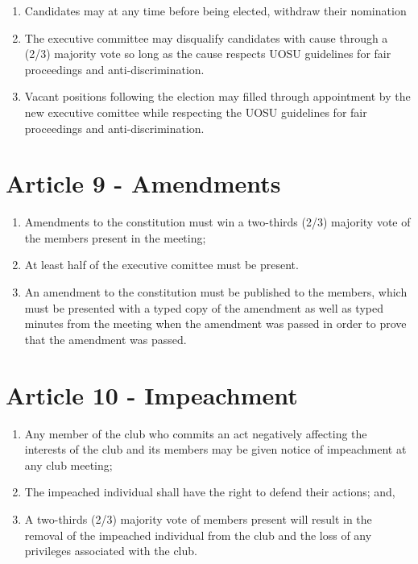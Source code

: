 \begin{enumerate}
\begin{enumerate}
             \item The candiate with the most votes will be elected
             \item Ties will be broken by (2/3) majority decision of the previous executives, while respecting the UOSU guidelines for fair proceedings and anti-discrimination.
             \item Following these proceedings, election results will be posted
         \end{enumerate}
     \item Candidates may at any time before being elected, withdraw their nomination 
     \item The executive committee may disqualify candidates with cause through a (2/3) majority vote so long as the cause respects UOSU guidelines for fair proceedings and anti-discrimination.
     \item Vacant positions following the election may filled through appointment by the new executive comittee while respecting the UOSU guidelines for fair proceedings and anti-discrimination.


\end{enumerate}

\section*{Article 9 - Amendments}

\begin{enumerate}
    \item Amendments to the constitution must win a two-thirds (2/3) majority vote of the members present in the meeting;

    \item At least half of the executive comittee must be present.

    \item An amendment to the constitution must be published to the members, which must be presented with a typed copy of the amendment as well as typed minutes from the meeting when the amendment was passed in order to prove that the amendment was passed.
\end{enumerate}

\section*{Article 10 - Impeachment}
\begin{enumerate}
    \item Any member of the club who commits an act negatively affecting the
        interests of the club and its members may be given notice of
        impeachment at any club meeting;
    \item The impeached individual shall have the right to defend their
        actions; and,
    \item A two-thirds (2/3) majority vote of members present will result in
        the removal of the impeached individual from the club and the loss
        of any privileges associated with the club.
\end{enumerate}

